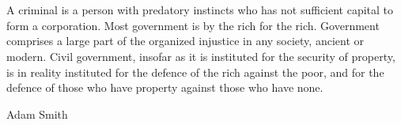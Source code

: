 \chapter{}
\epigraph{A criminal is a person with predatory instincts who has not sufficient capital to form a corporation. Most government is by the rich for the rich.
Government comprises a large part of the organized injustice in any society, ancient or modern.
Civil government, insofar as it is instituted for the security of property, is in reality instituted for the defence of the rich against the poor, and for the defence of those who have property against those who have none.}%
{Adam Smith}

\label{townChapter}

\section[\Glsfmttext{oolery}]{~}
\label{gnomishPart}


